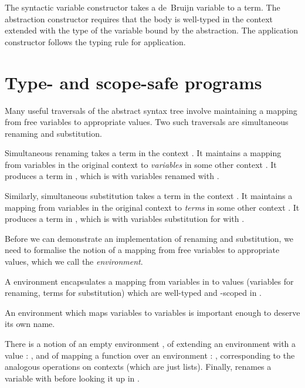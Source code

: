 \documentclass[bsc,frontabs,oneside,singlespacing,parskip,deptreport]{infthesis}
\theoremstyle{definition}
\theoremstyle{lemma}
\begin{document}
The syntactic variable  constructor takes a de~Bruijn variable to
a term. The abstraction constructor  requires that the body is
well-typed in the context  extended with the type  of the
variable bound by the abstraction. The application constructor
 follows the typing rule for application.


\section{Type- and scope-safe programs}
\label{sec:typ-scop-saf-prog}

Many useful traversals of the abstract syntax tree involve maintaining
a mapping from free variables to appropriate values. Two such
traversals are simultaneous renaming and substitution.

Simultaneous renaming takes a term  in the context . It maintains
a mapping  from variables in the original context  to
\textit{variables} in some other context . It produces a term in
, which is  with variables renamed with .

Similarly, simultaneous substitution takes a term  in the context
. It maintains a mapping  from variables in the original context
 to \textit{terms} in some other context . It produces a
term in , which is  with variables substitution for with .

Before we can demonstrate an implementation of renaming and
substitution, we need to formalise the notion of a mapping from free
variables to appropriate values, which we call the
\textit{environment}.


A environment  encapsulates a mapping from variables in
 to values  (variables for renaming, terms for
substitution) which are well-typed and -scoped in .

An environment which maps variables to variables is important enough
to deserve its own name.


There is a notion of an empty environment , of extending an
environment  with a value : , and of mapping a
function  over an environment : ,
corresponding to the analogous operations on contexts (which are just
lists). Finally,  renames a variable with 
before looking it up in .
\end{document}
